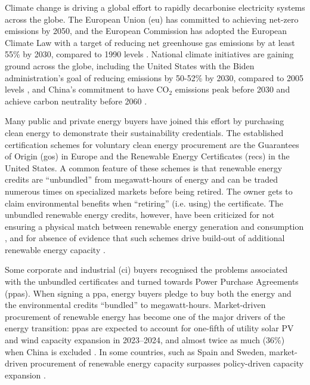 %



Climate change is driving a global effort to rapidly decarbonise electricity systems across the globe.
The European Union (\gls{eu}) has committed to achieving net-zero emissions by 2050, and the European Commission has adopted the European Climate Law with a target of reducing net greenhouse gas emissions by at least 55\% by 2030, compared to 1990 levels \cite{EuropeanClimateLaw2020}.
National climate initiatives are gaining ground across the globe, including the United States with the Biden administration's goal of reducing emissions by 50-52\% by 2030, compared to 2005 levels \cite{BidenClimatePlan2021}, and China's commitment to have CO$_2$ emissions peak before 2030 and achieve carbon neutrality before 2060 \cite{ChinaNetZero-IEA}.


Many public and private energy buyers have joined this effort by purchasing clean energy to demonstrate their sustainability credentials.
The established certification schemes for voluntary clean energy procurement are the Guarantees of Origin (\gls{go}s) in Europe and the Renewable Energy Certificates (\gls{rec}s) in the United States.
A common feature of these schemes is that renewable energy credits are \enquote{unbundled} from megawatt-hours of energy and can be traded numerous times on specialized markets before being retired.
The owner gets to claim environmental benefits when \enquote{retiring} (i.e. using) the certificate.
The unbundled renewable energy credits, however, have been criticized for not ensuring a physical match between renewable energy generation and consumption \cite{spglobal-recs, bock-icelandGOproblem, re100report-2020}, and for absence of evidence that such schemes drive build-out of additional renewable energy capacity \cite{bjorn-RECSnatcom-2022, gillenwater-2014}.

Some corporate and industrial (\gls{ci}) buyers recognised the problems associated with the unbundled certificates and turned towards Power Purchase Agreements (\gls{ppa}s).
When signing a \gls{ppa}, energy buyers pledge to buy both the energy and the environmental credits \enquote{bundled} to megawatt-hours.
Market-driven procurement of renewable energy has become one of the major drivers of the energy transition: \gls{ppa}s are expected to account for one-fifth of utility solar PV and wind capacity expansion in 2023--2024, and almost twice as much (36\%) when China is excluded \cite{iea-REppa2023}.
In some countries, such as Spain and Sweden, market-driven procurement of renewable energy capacity surpasses policy-driven capacity expansion \cite{iea-REppa2023}.

